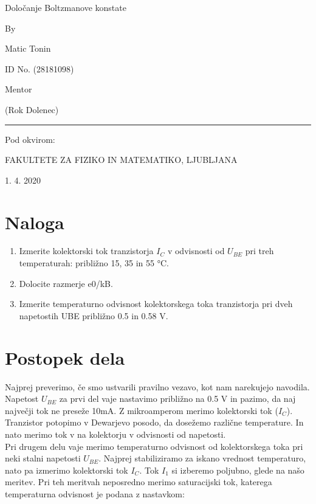 \documentclass[11pt, a4paper]{article}
\theoremstyle{definition}
\theoremstyle{example}
\theoremstyle{izrek}
\begin{document}
\begin{center}
\thispagestyle{empty}
\parskip=14pt%
\vspace*{3\parskip}%
\begin{Huge} Določanje Boltzmanove konstate \end{Huge}

By

Matic Tonin

ID No. (28181098)

Mentor 

(Rok Dolenec)

\rule{7cm}{0.4pt}

Pod okvirom:

FAKULTETE ZA FIZIKO IN MATEMATIKO, LJUBLJANA

1. 4. 2020

\end{center}
\pagebreak
\section{Naloga}
\begin{enumerate}
\item Izmerite kolektorski tok tranzistorja $I_C$ v odvisnosti od $U_{BE}$ pri treh temperaturah:
približno 15, 35 in 55 °C.
\item Dolocite razmerje e0/kB.
\item Izmerite temperaturno odvisnost kolektorskega toka tranzistorja pri dveh napetostih
UBE približno 0.5 in 0.58 V.
\end{enumerate}
\section{Postopek dela}
Najprej preverimo, če smo ustvarili pravilno vezavo, kot nam narekujejo navodila. Napetost $U_{BE}$ za prvi del vaje nastavimo približno na 0.5 V in pazimo, da naj največji tok ne preseže 10mA. Z mikroamperom merimo kolektorski tok ($I_C$). Tranzistor potopimo v Dewarjevo posodo, da dosežemo različne temperature. In nato merimo tok v na kolektorju v odvisnosti od napetosti. \\\medskip
Pri drugem delu vaje merimo temperaturno odvisnost od kolektorskega toka pri neki stalni napetosti $U_{BE}$. Najprej stabiliziramo za iskano vrednost temperaturo, nato pa izmerimo kolektorski tok $I_C$. Tok $I_1$ si izberemo poljubno, glede na našo meritev. Pri teh meritvah neposredno merimo saturacijski tok, katerega temperaturna odvisnost je podana z nastavkom:
\end{document}
